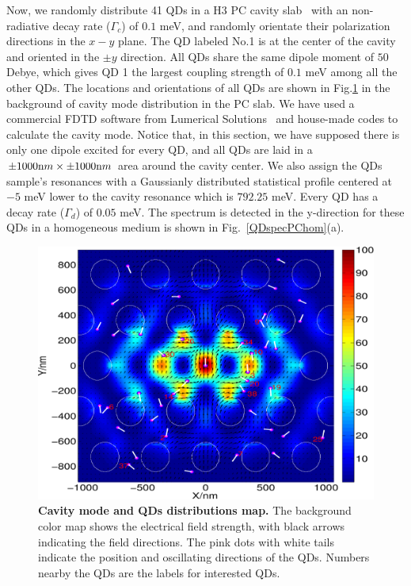 Now, we randomly distribute 41 QDs in a H3 PC cavity slab~\cite{Akahane2003} with an non-radiative decay rate ($\Gamma_c$) of $0.1$ meV,
and randomly orientate their polarization directions in the $x-y$ plane.
The QD labeled No.1 is at the center of the cavity and oriented in the $\pm y$ direction.
All QDs share the same dipole moment of $50$ Debye,
which gives QD 1 the largest coupling strength of $0.1$ meV among all the other QDs.
The locations and orientations of all QDs are shown in Fig.\ref{QDmode} in the background of cavity mode distribution in the PC slab.
We have used a commercial FDTD software from Lumerical Solutions~\cite{LumericalSolutions} and house-made codes to calculate the cavity mode.
Notice that, in this section, we have supposed there is only one dipole excited for every QD,
and all QDs are laid in a $\pm1000 {\text nm} \times \pm1000 {\text nm}$ area around the cavity center.
We also assign the QDs sample's resonances with a Gaussianly distributed statistical profile centered at $-5$ meV lower to the cavity resonance which is $792.25$ meV.
Every QD has a decay rate ($\Gamma_d$) of $0.05$ meV.
The spectrum is detected in the y-direction for these QDs in a homogeneous medium is shown in Fig.~\ref{QDspecPChom}(a).
\begin{figure}[htp]%
\centering
\begin{center}
\includegraphics[width=12cm]{./Figs/QDmode}
\end{center}
\caption[Cavity mode and 41-QD distribution in a PC cavity.]{\textbf{  Cavity mode and QDs distributions map.} The background color map shows the electrical field strength, with black arrows indicating the field directions. The pink dots with white tails indicate the position and oscillating directions of the QDs. Numbers nearby the QDs are the labels for interested QDs. }
\label{QDmode}
\end{figure}



